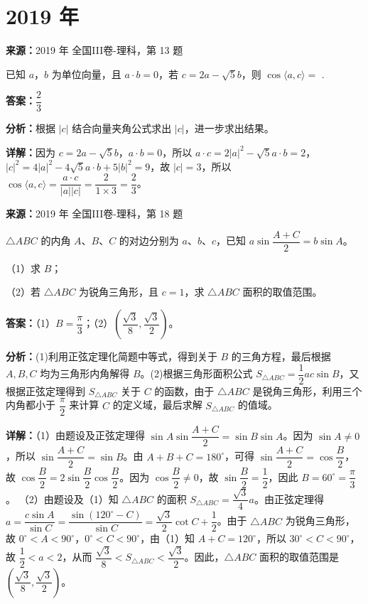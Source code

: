 \section*{2019 年}

\begin{question}[points=5]
\textbf{来源：}2019 年 全国III卷-理科，第 13 题\par
已知 $a$，$b$ 为单位向量，且 $a\cdot b=0$，若 $c = 2a - \sqrt{5}b$，则 $\cos\langle a,c\rangle =$ .
\fillin[{$\dfrac{2}{3}$}]
\begin{solution}
\textbf{答案：}$\dfrac{2}{3}$

\textbf{分析：}根据 $|c|$ 结合向量夹角公式求出 $|c|$，进一步求出结果。

\textbf{详解：}因为 $c = 2a - \sqrt{5}b$，$a\cdot b=0$，所以 $a\cdot c = 2|a|^2 - \sqrt{5}a\cdot b = 2$，$|c|^2 = 4|a|^2 -4\sqrt{5}a\cdot b + 5|b|^2 = 9$，故 $|c|=3$，所以 $\cos\langle a,c\rangle = \dfrac{a\cdot c}{|a||c|} = \dfrac{2}{1\times 3} = \dfrac{2}{3}$。
\end{solution}
\end{question}

\begin{question}[points=12]
\textbf{来源：}2019 年 全国III卷-理科，第 18 题\par
$\triangle ABC$ 的内角 $A$、$B$、$C$ 的对边分别为 $a$、$b$、$c$，已知 $a\sin\dfrac{A+C}{2} = b\sin A$。

（1）求 $B$；

（2）若 $\triangle ABC$ 为锐角三角形，且 $c=1$，求 $\triangle ABC$ 面积的取值范围。
\begin{solution}
\textbf{答案：}（1）$B = \dfrac{\pi}{3}$；（2）$\left(\dfrac{\sqrt{3}}{8},\dfrac{\sqrt{3}}{2}\right)$。

\textbf{分析：}(1)利用正弦定理化简题中等式，得到关于 $B$ 的三角方程，最后根据 $A,B,C$ 均为三角形内角解得 $B$。(2)根据三角形面积公式 $S_{\triangle ABC} = \dfrac{1}{2}ac\sin B$，又根据正弦定理得到 $S_{\triangle ABC}$ 关于 $C$ 的函数，由于 $\triangle ABC$ 是锐角三角形，利用三个内角都小于 $\dfrac{\pi}{2}$ 来计算 $C$ 的定义域，最后求解 $S_{\triangle ABC}$ 的值域。

\textbf{详解：}（1）由题设及正弦定理得 $\sin A\sin\dfrac{A+C}{2} = \sin B\sin A$。因为 $\sin A\neq 0$，所以 $\sin\dfrac{A+C}{2} = \sin B$。由 $A+B+C=180^\circ$，可得 $\sin\dfrac{A+C}{2} = \cos\dfrac{B}{2}$，故 $\cos\dfrac{B}{2} = 2\sin\dfrac{B}{2}\cos\dfrac{B}{2}$。因为 $\cos\dfrac{B}{2}\neq 0$，故 $\sin\dfrac{B}{2} = \dfrac{1}{2}$，因此 $B=60^\circ = \dfrac{\pi}{3}$。
（2）由题设及（1）知 $\triangle ABC$ 的面积 $S_{\triangle ABC} = \dfrac{\sqrt{3}}{4}a$。由正弦定理得 $a = \dfrac{c\sin A}{\sin C} = \dfrac{\sin(120^\circ - C)}{\sin C} = \dfrac{\sqrt{3}}{2}\cot C + \dfrac{1}{2}$。由于 $\triangle ABC$ 为锐角三角形，故 $0^\circ < A < 90^\circ$，$0^\circ < C < 90^\circ$，由（1）知 $A+C=120^\circ$，所以 $30^\circ < C < 90^\circ$，故 $\dfrac{1}{2} < a < 2$，从而 $\dfrac{\sqrt{3}}{8} < S_{\triangle ABC} < \dfrac{\sqrt{3}}{2}$。因此，$\triangle ABC$ 面积的取值范围是 $\left(\dfrac{\sqrt{3}}{8},\dfrac{\sqrt{3}}{2}\right)$。
\end{solution}
\end{question}

